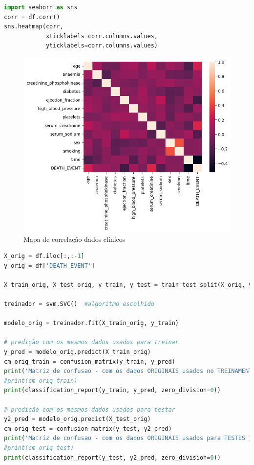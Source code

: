 \begin{lstlisting}[language=Python, style=input]
import seaborn as sns
corr = df.corr()
sns.heatmap(corr,
            xticklabels=corr.columns.values,
            yticklabels=corr.columns.values)
\end{lstlisting}

\begin{figure}[H]
\centering
\includegraphics[width=1\linewidth]{apendices/fig/6_IAA006_1.png}
\caption{Mapa de correlação dados clínicos}
\end{figure}


\begin{lstlisting}[language=Python, style=input]
X_orig = df.iloc[:,:-1]
y_orig = df['DEATH_EVENT']

X_train_orig, X_test_orig, y_train, y_test = train_test_split(X_orig, y_orig, test_size=0.20, stratify=y_orig,random_state=10)

treinador = svm.SVC()  #algoritmo escolhido

modelo_orig = treinador.fit(X_train_orig, y_train)

# predição com os mesmos dados usados para treinar
y_pred = modelo_orig.predict(X_train_orig)
cm_orig_train = confusion_matrix(y_train, y_pred)
print('Matriz de confusao - com os dados ORIGINAIS usados no TREINAMENTO')
#print(cm_orig_train)
print(classification_report(y_train, y_pred, zero_division=0))

# predição com os mesmos dados usados para testar
y2_pred = modelo_orig.predict(X_test_orig)
cm_orig_test = confusion_matrix(y_test, y2_pred)
print('Matriz de confusao - com os dados ORIGINAIS usados para TESTES')
#print(cm_orig_test)
print(classification_report(y_test, y2_pred, zero_division=0))
\end{lstlisting}



